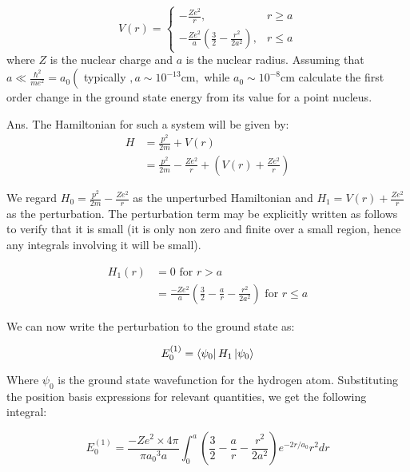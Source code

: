 \question
$$
V(r)=\left\{\begin{array}{cc}
-\frac{Z e^{2}}{r}, & r \geq a \\
-\frac{Z e^{2}}{a}\left(\frac{3}{2}-\frac{r^{2}}{2 a^{2}}\right), & r \leq a
\end{array}\right.
$$
where $Z$ is the nuclear charge and $a$ is the nuclear radius. Assuming that $a \ll \frac{\hbar^{2}}{m e^{2}}=a_{0}\left(\right.$ typically $, a \sim 10^{-13} \mathrm{cm},$ while $a_{0} \sim 10^{-8} \mathrm{cm}$
calculate the first order change in the ground state energy from its value for a point nucleus.

Ans. The Hamiltonian for such a system will be given by:
\begin{equation}
\begin{split}
    H &= \frac{p^2}{2m} + V(r)\\
    &= \frac{p^2}{2m} - \frac{Ze^2}{r} + \left( V(r) +  \frac{Ze^2}{r} \right)
\end{split}
\end{equation}

We regard $H_0 =  \frac{p^2}{2m} - \frac{Ze^2}{r} $ as the unperturbed Hamiltonian and $H_1 =  V(r) +  \frac{Ze^2}{r}$ as the perturbation. The perturbation term may be explicitly written as follows to verify that it is small (it is only non zero and finite over a small region, hence any integrals involving it will be small).

\begin{equation}
    \begin{split}
        H_1(r) &= 0 \text{ for } r>a\\
        &= \frac{-Ze^2}{a} \left( \frac{3}{2} - \frac{a}{r} - \frac{r^2}{2a^2} \right) \text{ for } r \leq a
    \end{split}
\end{equation}

We can now write the perturbation to the ground state as:

\begin{equation}
    E^{(1)}_0 = \bra{\psi_0} H_1 \ket{\psi_0}
\end{equation}

Where $\psi_0$ is the ground state wavefunction for the hydrogen atom. Substituting the position basis expressions for relevant quantities, we get the following integral:

\begin{equation}
    E^{(1)}_0 = \frac{-Ze^2 \times 4 \pi}{\pi {a_0}^3 a} \int_0^a \left( \frac{3}{2} - \frac{a}{r} - \frac{r^2}{2a^2} \right) e^{-2r/a_0} r^2 dr
\end{equation}

